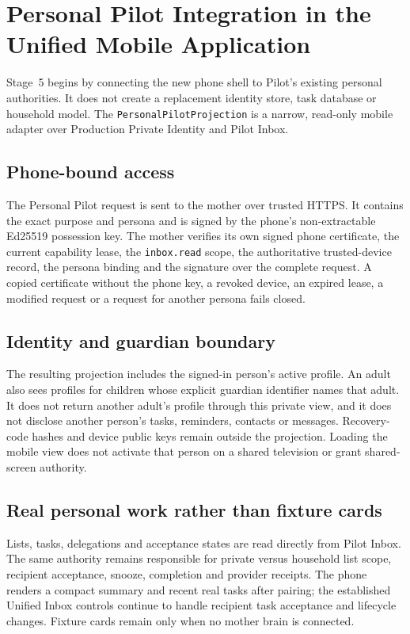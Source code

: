 \section{Personal Pilot Integration in the Unified Mobile Application}

Stage~5 begins by connecting the new phone shell to Pilot's existing personal authorities.  It
does not create a replacement identity store, task database or household model.  The
\texttt{PersonalPilotProjection} is a narrow, read-only mobile adapter over Production Private
Identity and Pilot Inbox.

\subsection{Phone-bound access}

The Personal Pilot request is sent to the mother over trusted HTTPS.  It contains the exact
purpose and persona and is signed by the phone's non-extractable Ed25519 possession key.  The
mother verifies its own signed phone certificate, the current capability lease, the
\texttt{inbox.read} scope, the authoritative trusted-device record, the persona binding and the
signature over the complete request.  A copied certificate without the phone key, a revoked
device, an expired lease, a modified request or a request for another persona fails closed.

\subsection{Identity and guardian boundary}

The resulting projection includes the signed-in person's active profile.  An adult also sees
profiles for children whose explicit guardian identifier names that adult.  It does not return
another adult's profile through this private view, and it does not disclose another person's
tasks, reminders, contacts or messages.  Recovery-code hashes and device public keys remain
outside the projection.  Loading the mobile view does not activate that person on a shared
television or grant shared-screen authority.

\subsection{Real personal work rather than fixture cards}

Lists, tasks, delegations and acceptance states are read directly from Pilot Inbox.  The same
authority remains responsible for private versus household list scope, recipient acceptance,
snooze, completion and provider receipts.  The phone renders a compact summary and recent real
tasks after pairing; the established Unified Inbox controls continue to handle recipient task
acceptance and lifecycle changes.  Fixture cards remain only when no mother brain is connected.

